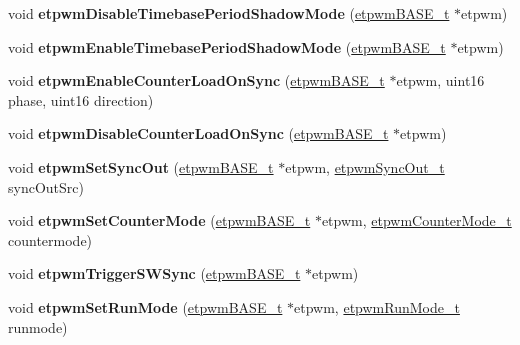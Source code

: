 \begin{DoxyCompactItemize}
void {\bfseries etpwm\+Disable\+Timebase\+Period\+Shadow\+Mode} (\mbox{\hyperlink{reg__etpwm_8h_a3030c3a8f18ffd60ee3de5bbd7632891}{etpwm\+B\+A\+S\+E\+\_\+t}} $\ast$etpwm)
\item 
\mbox{\label{group__ePWM_gafa94567563d5f4053edc62d886b5ca93}} 
void {\bfseries etpwm\+Enable\+Timebase\+Period\+Shadow\+Mode} (\mbox{\hyperlink{reg__etpwm_8h_a3030c3a8f18ffd60ee3de5bbd7632891}{etpwm\+B\+A\+S\+E\+\_\+t}} $\ast$etpwm)
\item 
\mbox{\label{group__ePWM_ga734bed75bba8aadf24e371d0d57bb076}} 
void {\bfseries etpwm\+Enable\+Counter\+Load\+On\+Sync} (\mbox{\hyperlink{reg__etpwm_8h_a3030c3a8f18ffd60ee3de5bbd7632891}{etpwm\+B\+A\+S\+E\+\_\+t}} $\ast$etpwm, uint16 phase, uint16 direction)
\item 
\mbox{\label{group__ePWM_ga9e5acec5f4ea5d73d1c9c0e56158eda8}} 
void {\bfseries etpwm\+Disable\+Counter\+Load\+On\+Sync} (\mbox{\hyperlink{reg__etpwm_8h_a3030c3a8f18ffd60ee3de5bbd7632891}{etpwm\+B\+A\+S\+E\+\_\+t}} $\ast$etpwm)
\item 
\mbox{\label{group__ePWM_gab6089b6dac639f4b5eed1a27ae608b54}} 
void {\bfseries etpwm\+Set\+Sync\+Out} (\mbox{\hyperlink{reg__etpwm_8h_a3030c3a8f18ffd60ee3de5bbd7632891}{etpwm\+B\+A\+S\+E\+\_\+t}} $\ast$etpwm, \mbox{\hyperlink{etpwm_8h_a7cb693b301ed14705eb6cef878f6ae0b}{etpwm\+Sync\+Out\+\_\+t}} sync\+Out\+Src)
\item 
\mbox{\label{group__ePWM_ga5263272f0411ddd5512a6dfb3b0ce350}} 
void {\bfseries etpwm\+Set\+Counter\+Mode} (\mbox{\hyperlink{reg__etpwm_8h_a3030c3a8f18ffd60ee3de5bbd7632891}{etpwm\+B\+A\+S\+E\+\_\+t}} $\ast$etpwm, \mbox{\hyperlink{etpwm_8h_adf8a327bcf89160f954d51f051ef64b3}{etpwm\+Counter\+Mode\+\_\+t}} countermode)
\item 
\mbox{\label{group__ePWM_ga533493dea3ca9a1e2d3160adb2c7fbfe}} 
void {\bfseries etpwm\+Trigger\+S\+W\+Sync} (\mbox{\hyperlink{reg__etpwm_8h_a3030c3a8f18ffd60ee3de5bbd7632891}{etpwm\+B\+A\+S\+E\+\_\+t}} $\ast$etpwm)
\item 
\mbox{\label{group__ePWM_ga6e9e11a1053bbe3778e317d2cf1099de}} 
void {\bfseries etpwm\+Set\+Run\+Mode} (\mbox{\hyperlink{reg__etpwm_8h_a3030c3a8f18ffd60ee3de5bbd7632891}{etpwm\+B\+A\+S\+E\+\_\+t}} $\ast$etpwm, \mbox{\hyperlink{etpwm_8h_aad909e1a09a8833e36cbbabebf5279ee}{etpwm\+Run\+Mode\+\_\+t}} runmode)

\end{DoxyCompactItemize}
